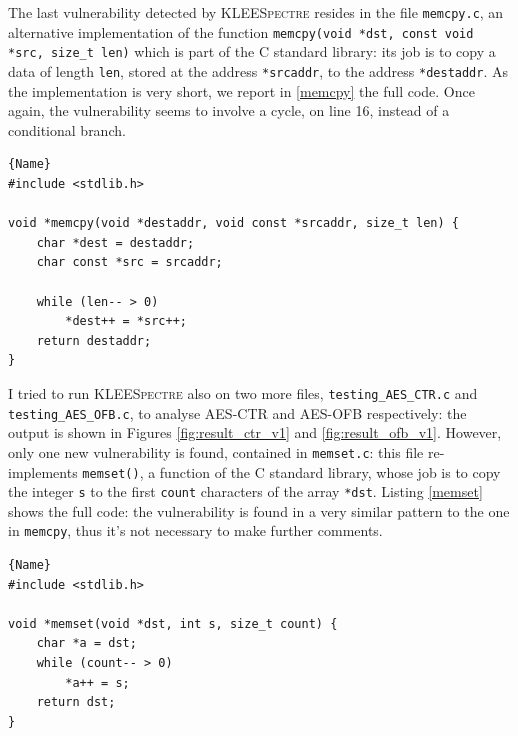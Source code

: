 \documentclass[12pt,a4paper]{book}
\theoremstyle{definition}
\begin{document}
	The last vulnerability detected by \textsc{KLEESpectre} resides in the file \texttt{memcpy.c}, an alternative implementation of the function \texttt{memcpy(void *dst, const void *src, size\_t len)} which is part of the C standard library: its job is to copy a data of length \texttt{len}, stored at the address \texttt{*srcaddr}, to the address \texttt{*destaddr}. As the implementation is very short, we report in \ref{memcpy} the full code. Once again, the vulnerability seems to involve a cycle, on line 16, instead of a conditional branch.
	
	\lstset{
		numbers=left
	}
	\begin{minipage}{.9\textwidth}
	\begin{lstlisting}[caption=\texttt{memcpy.c}, firstnumber=10, label=memcpy]{Name}
#include <stdlib.h>

void *memcpy(void *destaddr, void const *srcaddr, size_t len) {
	char *dest = destaddr;
	char const *src = srcaddr;
	
	while (len-- > 0)
		*dest++ = *src++;
	return destaddr;
}
	\end{lstlisting}
	\end{minipage}	
	\vspace{3mm}
		
	I tried to run \textsc{KLEESpectre} also on two more files, \texttt{testing\_AES\_CTR.c} and \texttt{testing\_AES\_OFB.c}, to analyse AES-CTR and AES-OFB respectively: the output is shown in Figures \ref{fig:result_ctr_v1} and \ref{fig:result_ofb_v1}. However, only one new vulnerability is found, contained in \texttt{memset.c}: this file re-implements \texttt{memset()}, a function of the C standard library, whose job is to copy the integer \texttt{s} to the first \texttt{count} characters of the array \texttt{*dst}. Listing \ref{memset} shows the full code: the vulnerability is found in a very similar pattern to the one in \texttt{memcpy}, thus it's not necessary to make further comments.

	\begin{minipage}{.75\textwidth}
		\begin{lstlisting}[caption=\texttt{memcpy.c}, firstnumber=10, label=memset]{Name}
#include <stdlib.h>

void *memset(void *dst, int s, size_t count) {
	char *a = dst;
	while (count-- > 0)
		*a++ = s;
	return dst;
}
		\end{lstlisting}
	\end{minipage}
	\vspace{3mm}
	
\end{document}

